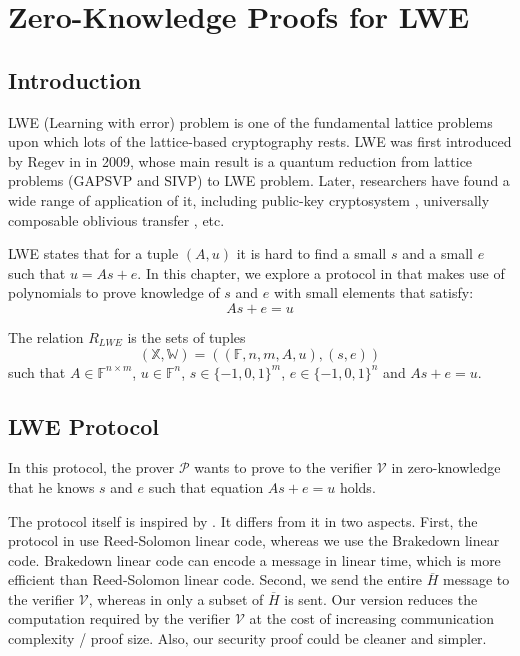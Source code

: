 \chapter{Zero-Knowledge Proofs for LWE}

\section{Introduction}

LWE (Learning with error) problem is one of the fundamental lattice problems upon which lots of the lattice-based cryptography rests. LWE was first introduced by Regev in \cite{DBLP:journals/jacm/Regev09} in 2009, whose main result is a quantum reduction from lattice problems (GAPSVP and SIVP) to LWE problem. Later, researchers have found a wide range of application of it, including public-key cryptosystem \cite{DBLP:journals/jacm/LyubashevskyPR13}, universally composable oblivious transfer \cite{DBLP:conf/crypto/PeikertVW08}, etc.

LWE states that for a tuple $(A, u)$ it is hard to find a small $s$ and a small $e$ such that $u = As+e$. In this chapter, we explore a protocol in \cite{lwe} that makes use of polynomials to prove knowledge of $s$ and $e$ with small elements that satisfy:
$$
    As + e = u
$$

\begin{definition}
The relation $R_{LWE}$ is the sets of tuples
$$
    (\mathbb{X}, \mathbb{W}) = ((\mathbb{F}, n, m, A, u), (s, e))
$$ 
such that $A \in \mathbb{F}^{n \times m}$, $u \in \mathbb{F}^{n}$, $s \in \{-1, 0, 1\}^{m}$, $e \in \{-1, 0, 1\}^{n}$ and $As + e = u$.
\end{definition}


\section{LWE Protocol}

In this protocol, the prover $\mathcal{P}$ wants to prove to the verifier $\mathcal{V}$ in zero-knowledge that he knows $s$ and $e$ such that equation $As + e = u$ holds.

The protocol itself is inspired by \cite{lwe}. It differs from it in two aspects. First, the protocol in \cite{lwe} use Reed-Solomon linear code, whereas we use the Brakedown linear code. Brakedown linear code can encode a message in linear time, which is more efficient than Reed-Solomon linear code. Second, we send the entire $\overline{H}$ message to the verifier $\mathcal{V}$, whereas in \cite{lwe} only a subset of $\overline{H}$ is sent. Our version reduces the computation required by the verifier $\mathcal{V}$ at the cost of increasing communication complexity / proof size. Also, our security proof could be cleaner and simpler.

